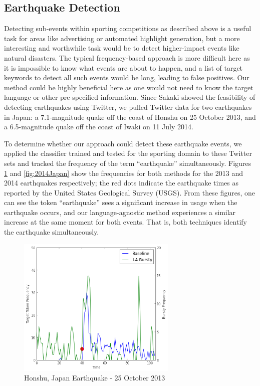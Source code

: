 \documentclass{acm_proc_article-sp}
\begin{document}
\subsection{Earthquake Detection}

Detecting sub-events within sporting competitions as described above is a useful task for areas like advertising or automated highlight generation, but a more interesting and worthwhile task would be to detect higher-impact events like natural disasters.
The typical frequency-based approach is more difficult here as it is impossible to know what events are about to happen, and a list of target keywords to detect all such events would be long, leading to false positives.
Our method could be highly beneficial here as one would not need to know the target language or other pre-specified information.
Since Sakaki showed the feasibility of detecting earthquakes using Twitter, we pulled Twitter data for two earthquakes in Japan: a 7.1-magnitude quake off the coast of Honshu on 25 October 2013, and a 6.5-magnitude quake off the coast of Iwaki on 11 July 2014.

To determine whether our approach could detect these earthquake events, we applied the classifier trained and tested for the sporting domain to these Twitter sets and tracked the frequency of the term ``earthquake'' simultaneously.
Figures \ref{fig:2013Japan} and \ref{fig:2014Japan} show the frequencies for both methods for the 2013 and 2014 earthquakes respectively; the red dots indicate the earthquake times as reported by the United States Geological Survey (USGS).
From these figures, one can see the token ``earthquake'' sees a significant increase in usage when the earthquake occurs, and our language-agnostic method experiences a similar increase at the same moment for both events.
That is, both techniques identify the earthquake simultaneously.

\begin{figure}[hbt]
\begin{center}
\includegraphics[width=3in]{./figures/2013-japan-quake.png}
\caption{Honshu, Japan Earthquake - 25 October 2013}
\label{fig:2013Japan}
\end{center}
\end{figure}
\end{document}
